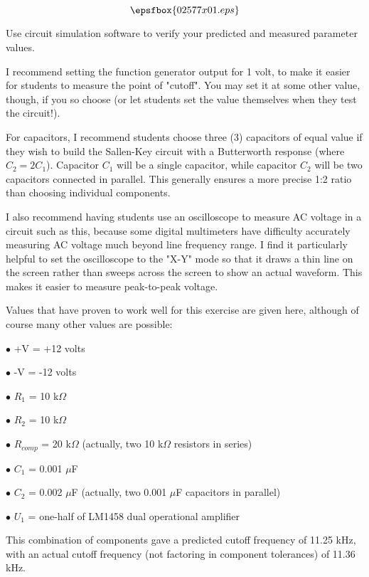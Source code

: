 

$$\epsfbox{02577x01.eps}$$

\vfil \eject






Use circuit simulation software to verify your predicted and measured parameter values.







I recommend setting the function generator output for 1 volt, to make it easier for students to measure the point of "cutoff".  You may set it at some other value, though, if you so choose (or let students set the value themselves when they test the circuit!).

For capacitors, I recommend students choose three (3) capacitors of equal value if they wish to build the Sallen-Key circuit with a Butterworth response (where $C_2 = 2 C_1$).  Capacitor $C_1$ will be a single capacitor, while capacitor $C_2$ will be two capacitors connected in parallel.  This generally ensures a more precise 1:2 ratio than choosing individual components.

I also recommend having students use an oscilloscope to measure AC voltage in a circuit such as this, because some digital multimeters have difficulty accurately measuring AC voltage much beyond line frequency range.  I find it particularly helpful to set the oscilloscope to the "X-Y" mode so that it draws a thin line on the screen rather than sweeps across the screen to show an actual waveform.  This makes it easier to measure peak-to-peak voltage.

Values that have proven to work well for this exercise are given here, although of course many other values are possible:

\medskip
\goodbreak
\item{$\bullet$} +V = +12 volts
\item{$\bullet$} -V = -12 volts
\item{$\bullet$} $R_1$ = 10 k$\Omega$
\item{$\bullet$} $R_2$ = 10 k$\Omega$
\item{$\bullet$} $R_{comp}$ = 20 k$\Omega$ (actually, two 10 k$\Omega$ resistors in series)
\item{$\bullet$} $C_1$ = 0.001 $\mu$F
\item{$\bullet$} $C_2$ = 0.002 $\mu$F (actually, two 0.001 $\mu$F capacitors in parallel)
\item{$\bullet$} $U_1$ = one-half of LM1458 dual operational amplifier
\medskip

This combination of components gave a predicted cutoff frequency of 11.25 kHz, with an actual cutoff frequency (not factoring in component tolerances) of 11.36 kHz.




